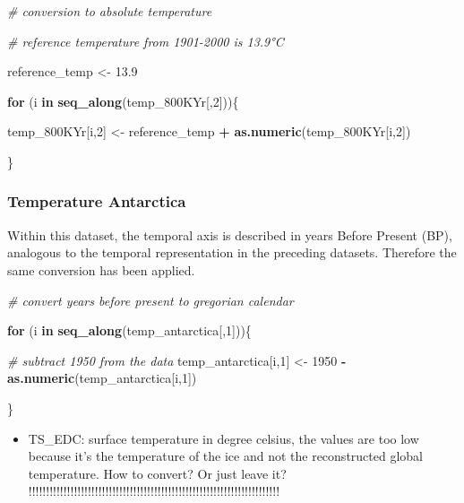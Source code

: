 \documentclass[
]{article}
\newenvironment{Shaded}{\begin{snugshade}}{\end{snugshade}}
\newcommand{\CommentTok}[1]{\textcolor[rgb]{0.56,0.35,0.01}{\textit{#1}}}
\newcommand{\ControlFlowTok}[1]{\textcolor[rgb]{0.13,0.29,0.53}{\textbf{#1}}}
\newcommand{\DecValTok}[1]{\textcolor[rgb]{0.00,0.00,0.81}{#1}}
\newcommand{\FloatTok}[1]{\textcolor[rgb]{0.00,0.00,0.81}{#1}}
\newcommand{\FunctionTok}[1]{\textcolor[rgb]{0.13,0.29,0.53}{\textbf{#1}}}
\newcommand{\NormalTok}[1]{#1}
\newcommand{\OtherTok}[1]{\textcolor[rgb]{0.56,0.35,0.01}{#1}}
\newcommand{\SpecialCharTok}[1]{\textcolor[rgb]{0.81,0.36,0.00}{\textbf{#1}}}
\providecommand{\tightlist}{%
  \setlength{\itemsep}{0pt}\setlength{\parskip}{0pt}}
\begin{document}
\begin{Shaded}
\begin{Highlighting}[]
\CommentTok{\# conversion to absolute temperature}

\CommentTok{\# reference temperature from 1901{-}2000 is 13.9°C}

\NormalTok{reference\_temp }\OtherTok{\textless{}{-}} \FloatTok{13.9}

\ControlFlowTok{for}\NormalTok{ (i }\ControlFlowTok{in} \FunctionTok{seq\_along}\NormalTok{(temp\_800KYr[,}\DecValTok{2}\NormalTok{]))\{}
 
\NormalTok{    temp\_800KYr[i,}\DecValTok{2}\NormalTok{] }\OtherTok{\textless{}{-}}\NormalTok{ reference\_temp }\SpecialCharTok{+} \FunctionTok{as.numeric}\NormalTok{(temp\_800KYr[i,}\DecValTok{2}\NormalTok{])}
    
\NormalTok{\}}
\end{Highlighting}
\end{Shaded}

\hypertarget{temperature-antarctica}{%
\subsubsection{Temperature Antarctica}\label{temperature-antarctica}}

Within this dataset, the temporal axis is described in years Before
Present (BP), analogous to the temporal representation in the preceding
datasets. Therefore the same conversion has been applied.

\begin{Shaded}
\begin{Highlighting}[]
\CommentTok{\# convert years before present to gregorian calendar}

  \ControlFlowTok{for}\NormalTok{ (i }\ControlFlowTok{in} \FunctionTok{seq\_along}\NormalTok{(temp\_antarctica[,}\DecValTok{1}\NormalTok{]))\{}
    
    \CommentTok{\# subtract 1950 from the data}
\NormalTok{    temp\_antarctica[i,}\DecValTok{1}\NormalTok{] }\OtherTok{\textless{}{-}} \DecValTok{1950} \SpecialCharTok{{-}} \FunctionTok{as.numeric}\NormalTok{(temp\_antarctica[i,}\DecValTok{1}\NormalTok{])}
    
\NormalTok{  \}}
\end{Highlighting}
\end{Shaded}

\begin{itemize}
\tightlist
\item
  TS\_EDC: surface temperature in degree celsius, the values are too low
  because it's the temperature of the ice and not the reconstructed
  global temperature. How to convert? Or just leave it?
  !!!!!!!!!!!!!!!!!!!!!!!!!!!!!!!!!!!!!!!!!!!!!!!!!!!!!!!!!!!!!!!!!!!!!!!!
\end{itemize}
\end{document}
